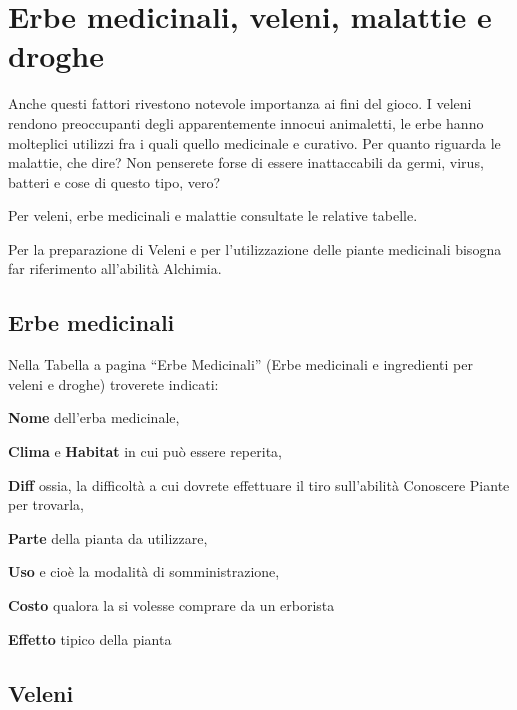 {\sloppypar\raggedright \section{Erbe medicinali, veleni, malattie e droghe}}

Anche questi fattori rivestono notevole importanza ai fini del gioco.
I veleni rendono preoccupanti degli apparentemente innocui animaletti,
le erbe hanno molteplici utilizzi fra i quali quello medicinale e
curativo. Per quanto riguarda le malattie, che dire? Non penserete
forse di essere inattaccabili da germi, virus, batteri e cose di
questo tipo, vero? 

Per veleni, erbe medicinali e malattie consultate le relative tabelle.

Per la preparazione di Veleni e per l'utilizzazione delle piante
medicinali bisogna far riferimento all'abilit\`a Alchimia.

\subsection{Erbe medicinali} 

Nella Tabella a pagina \pageref{taberbe} ``Erbe Medicinali'' (Erbe
medicinali e ingredienti per veleni e droghe) troverete indicati:


\begin{description}
\item{\textbf{Nome}} dell'erba medicinale,
\item{\textbf{Clima}} e \textbf{Habitat} in cui pu\`o essere
  reperita,
\item{\textbf{Diff}} ossia, la difficolt\`a a cui dovrete effettuare
  il tiro sull'abilit\`a Conoscere Piante per trovarla,
\item{\textbf{Parte}} della pianta da utilizzare,
\item{\textbf{Uso}} e cio\`e la modalit\`a di somministrazione,
\item{\textbf{Costo}} qualora la si volesse comprare da un erborista
\item{\textbf{Effetto}} tipico della pianta
\end{description}



\subsection{Veleni}


